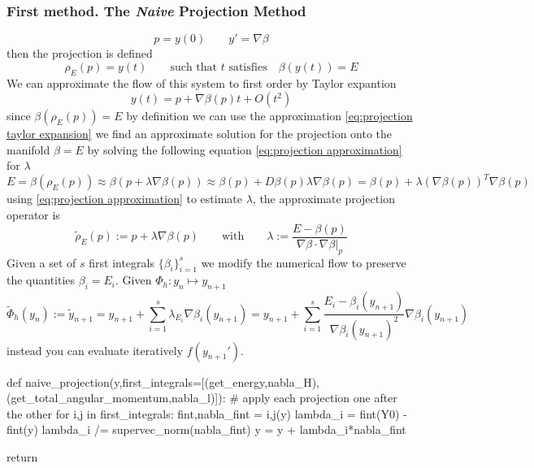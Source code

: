 \documentclass[12pt]{article}
\begin{document}
\subsubsection{First method. The \textit{Naive} Projection Method}
\begin{equation}\label{eq:projection ivp}
    p = y(0) \qquad y' = \nabla \beta
\end{equation}
then the projection is defined
\begin{equation}\label{eq:projection}
    \rho_E(p) = y(t) \qquad\text{such that $t$ satisfies} \quad\beta(y(t)) = E
\end{equation}
We can approximate the flow of this system to first order by Taylor expantion
\begin{equation}\label{eq:projection taylor expansion}
    y(t) = p + \nabla \beta(p) t + O(t^2)
\end{equation}
since $\beta(\rho_E(p))=E$ by definition we can use the approximation \eqref{eq:projection taylor expansion} we find an approximate solution for the projection onto the manifold $\beta=E$ by solving the following equation \eqref{eq:projection approximation} for $\lambda$
\begin{equation}\label{eq:projection approximation}
    E = \beta(\rho_E(p)) \approx \beta(p + \lambda\nabla\beta(p)) \approx \beta(p) + D\beta(p) \lambda \nabla \beta(p) = \beta(p) + \lambda \left(\nabla\beta(p)\right)^T\nabla\beta(p)
\end{equation}
using \eqref{eq:projection approximation} to estimate $\lambda$, the approximate projection operator is
\begin{equation}\label{eq:approximate projection operator}
    \widetilde\rho_E(p) := p + \lambda\nabla\beta(p) \qquad \text{with}\qquad \lambda := \frac{E - \beta(p)}{\nabla\beta\cdot\nabla\beta\big|_p}
\end{equation}
Given a set of $s$ first integrals $\{\beta_i\}_{i=1}^s$ we modify the numerical flow to preserve the quantities $\beta_i = E_i$. Given $\Phi_h : y_n \mapsto y_{n+1}$
\begin{equation}\label{eq:modified numerical flow}
    \widetilde \Phi_h(y_n) := \tilde y_{n+1} = y_{n+1} + \sum_{i=1}^s \lambda_{E_i}\nabla\beta_i(y_{n+1})
    = y_{n+1} + \sum_{i=1}^s \frac{E_i - \beta_i(y_{n+1})}{\nabla\beta_i(y_{n+1})^2}\nabla\beta_i(y_{n+1})
\end{equation}
instead you can evaluate iteratively $f(y_{n+1}')$.\\

\begin{python}\label{code:naive projection method kepler}
def naive_projection(y,first_integrals=[(get_energy,nabla_H),
                                        (get_total_angular_momentum,nabla_l)]):
    # apply each projection one after the other 
    for i,j in first_integrals:
        fint,nabla_fint = i,j(y) 
        lambda_i = fint(Y0) - fint(y) 
        lambda_i /= supervec_norm(nabla_fint)
        y = y + lambda_i*nabla_fint 
        
    return
\end{python}
\end{document}
